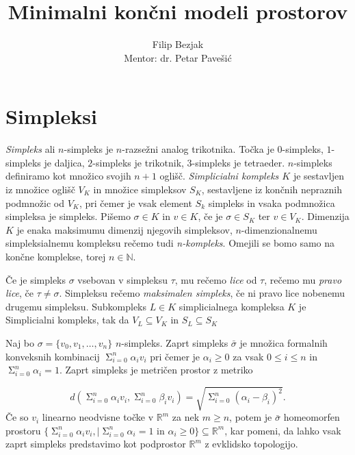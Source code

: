 \documentclass[a4paper,12pt]{article}
\title{Minimalni končni modeli prostorov}
\author{Filip Bezjak \\ Mentor: dr. Petar Pavešić}
\newcommand\mymathop[1]{\mathop{\operatorname{#1}}}
\theoremstyle{definition}
\theoremstyle{plain}
\theoremstyle{definition}
\theoremstyle{plain}
\theoremstyle{plain}
\theoremstyle{plain}
\theoremstyle{plain}
\begin{document}
\section{Simpleksi}


\textit{Simpleks} ali $n$-simpleks je $n$-razsežni analog trikotnika. Točka je $0$-simpleks, $1$-simpleks je daljica, $2$-simpleks je trikotnik,
$3$-simpleks je tetraeder. $n$-simpleks definiramo kot množico svojih $n+1$ oglišč. \textit{Simplicialni kompleks $K$} je sestavljen iz množice oglišč $V_K$ in množice simpleksov $S_K$, sestavljene iz končnih nepraznih podmnožic od $V_K$, pri čemer je vsak element $S_k$ simpleks in vsaka podmnožica simpleksa je simpleks. Pišemo $\sigma \in K$ in $v \in K$, če je $\sigma \in S_K$ ter $v \in V_K$. Dimenzija $K$ je enaka maksimumu dimenzij njegovih simpleksov, $n$-dimenzionalnemu simpleksialnemu kompleksu rečemo tudi \textit{n-kompleks}. Omejili se bomo samo na končne komplekse, torej $n \in \mathbb{N}$.

Če je simpleks $\sigma$ vsebovan  v simpleksu $\tau$, mu rečemo \textit{lice} od $\tau$, rečemo mu \textit{pravo lice}, če $\tau\neq \sigma$. 
Simpleksu rečemo \textit{maksimalen simpleks}, če ni pravo lice nobenemu drugemu simpleksu. Subkompleks $L\in K$ simplicialnega kompleksa
 $K$ je Simplicialni kompleks, tak da $V_L\subseteq V_K$ in $S_L\subseteq S_K$


Naj bo $\sigma = \{v_0,v_1,\ldots,v_n\}$ $n$-simpleks. Zaprt
simpleks $\bar{\sigma}$ je množica formalnih konveksnih kombinacij $\mymathop{\Sigma}_{i=0}^{n}\alpha_i v_i$
pri čemer je $\alpha_i \ge 0$ za vsak $0\le i \le n$ in $\mymathop{\Sigma}_{i=0}^{n}\alpha_i = 1$. Zaprt simpleks je metričen prostor z metriko

\begin{equation}
    \label{eq:metrika}    
d(\mymathop{\Sigma}_{i=0}^{n}\alpha_i v_i,\mymathop{\Sigma}_{i=0}^{n}\beta_i v_i) = \sqrt{\mymathop{\Sigma}_{i=0}^{n}(\alpha_i - \beta_i)^2}.
\end{equation}
Če so $v_i$ linearno neodvisne točke v $\mathbb{R}^m$ za nek $m\geq n$, potem je $\bar{\sigma}$ homeomorfen prostoru 
$\{\mymathop{\Sigma}_{i=0}^{n}\alpha_i v_i, | \mymathop{\Sigma}_{i=0}^{n}\alpha_i = 1 \text{ in } \alpha_i \ge 0 \}\subseteq \mathbb{R}^m$, 
kar pomeni, da lahko vsak zaprt simpleks predstavimo kot podprostor $\mathbb{R}^m$ z evklidsko topologijo.
\end{document}
